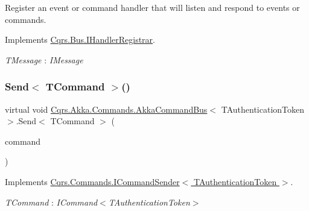 Register an event or command handler that will listen and respond to events or commands. 



Implements \hyperlink{interfaceCqrs_1_1Bus_1_1IHandlerRegistrar_a07792dcc9a8b272709ff2e2dd336a642}{Cqrs.\+Bus.\+I\+Handler\+Registrar}.

\begin{Desc}
\item[Type Constraints]\begin{description}
\item[{\em T\+Message} : {\em I\+Message}]\end{description}
\end{Desc}
\mbox{\label{classCqrs_1_1Akka_1_1Commands_1_1AkkaCommandBus_a696f471533265685f80922e39727288e}} 
\subsubsection{\texorpdfstring{Send$<$ T\+Command $>$()}{Send< TCommand >()}\hspace{0.1cm}{\footnotesize\ttfamily [1/2]}}
{\footnotesize\ttfamily virtual void \hyperlink{classCqrs_1_1Akka_1_1Commands_1_1AkkaCommandBus}{Cqrs.\+Akka.\+Commands.\+Akka\+Command\+Bus}$<$ T\+Authentication\+Token $>$.Send$<$ T\+Command $>$ (\begin{DoxyParamCaption}\item[{T\+Command}]{command }\end{DoxyParamCaption})\hspace{0.3cm}{\ttfamily [virtual]}}



Implements \hyperlink{interfaceCqrs_1_1Commands_1_1ICommandSender_a551d69f8679399fc0ce0fd99dead507a}{Cqrs.\+Commands.\+I\+Command\+Sender$<$ T\+Authentication\+Token $>$}.

\begin{Desc}
\item[Type Constraints]\begin{description}
\item[{\em T\+Command} : {\em I\+Command$<$T\+Authentication\+Token$>$}]\end{description}
\end{Desc}
\mbox{\label{classCqrs_1_1Akka_1_1Commands_1_1AkkaCommandBus_a06b7b148493c67d79aaf6b7d59afa487}} 
